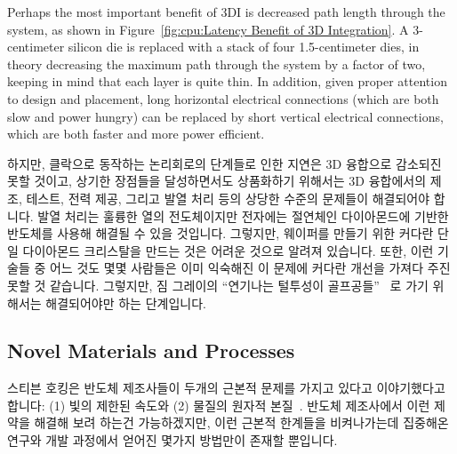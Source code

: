 Perhaps the most important benefit of 3DI is decreased path length through
the system, as shown in
Figure~\ref{fig:cpu:Latency Benefit of 3D Integration}.
A 3-centimeter silicon die is replaced with a stack of four 1.5-centimeter
dies, in theory decreasing the maximum path through the system by a factor
of two, keeping in mind that each layer is quite thin.
In addition, given proper attention to design and placement,
long horizontal electrical connections (which are both slow and
power hungry) can be replaced by short vertical electrical connections,
which are both faster and more power efficient.
\fi

하지만, 클락으로 동작하는 논리회로의 단계들로 인한 지연은 3D 융합으로 감소되진
못할 것이고, 상기한 장점들을 달성하면서도 상품화하기 위해서는 3D 융합에서의
제조, 테스트, 전력 제공, 그리고 발열 처리 등의 상당한 수준의 문제들이
해결되어야 합니다.
발열 처리는 훌륭한 열의 전도체이지만 전자에는 절연체인 다이아몬드에 기반한
반도체를 사용해 해결될 수 있을 것입니다.
그렇지만, 웨이퍼를 만들기 위한 커다란 단일 다이아몬드 크리스탈을 만드는 것은
어려운 것으로 알려져 있습니다.
또한, 이런 기술들 중 어느 것도 몇몇 사람들은 이미 익숙해진 이 문제에 커다란
개선을 가져다 주진 못할 것 같습니다.
그렇지만, 짐 그레이의 ``연기나는 털투성이
골프공들''~\cite{JimGray2002SmokingHairyGolfBalls} 로 가기 위해서는
해결되어야만 하는 단계입니다.
\iffalse

However, delays due to levels of clocked logic will not be decreased
by 3D integration, and significant manufacturing, testing, power-supply,
and heat-dissipation problems must be solved for 3D integration to
reach production while still delivering on its promise.
The heat-dissipation problems might be solved using
semiconductors based on diamond, which is a good conductor
for heat, but an electrical insulator.
That said, it remains difficult to grow large single diamond crystals,
to say nothing of slicing them into wafers.
In addition, it seems unlikely that any of these technologies will be able to
deliver the exponential increases to which some people have become accustomed.
That said, they may be necessary steps on the path to the late Jim Gray's
``smoking hairy golf balls''~\cite{JimGray2002SmokingHairyGolfBalls}.
\fi

\subsection{Novel Materials and Processes}
\label{sec:cpu:Novel Materials and Processes}

스티븐 호킹은 반도체 제조사들이 두개의 근본적 문제를 가지고 있다고 이야기했다고
합니다: (1) 빛의 제한된 속도와 (2) 물질의 원자적 본질~\cite{BryanGardiner2007}.
반도체 제조사에서 이런 제약을 해결해 보려 하는건 가능하겠지만, 이런 근본적
한계들을 비켜나가는데 집중해온 연구와 개발 과정에서 얻어진 몇가지 방법만이
존재할 뿐입니다.
\iffalse

